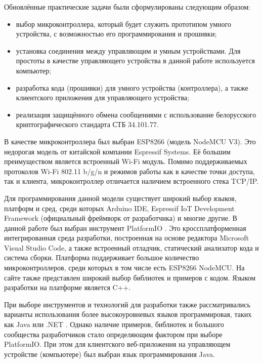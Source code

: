 	Обновлённые практические задачи были сформулированы следующим образом:
	
	\begin{itemize}
		\item выбор микроконтроллера, который будет служить прототипом умного устройства,
		с возможностью его программирования и прошивки;
		\item установка соединения между управляющим и умным устройствами. Для простоты в качестве
		управляющего устройства в данной работе используется компьютер;
		\item разработка кода (прошивки) для умного устройства (контроллера), а также клиентского
		приложения для управляющего устройства;
		\item реализация защищённого обмена сообщениями с использование белорусского криптографического
		стандарта СТБ 34.101.77.
	\end{itemize}

	В качестве микроконтроллера был выбран ESP8266 (модель NodeMCU V3). Это недорогая модель от
	китайской компании Espressif Systems. Её большим преимуществом является встроенный Wi-Fi модуль. 
	Помимо поддерживаемых протоколов Wi-Fi 802.11 b/g/n и режимов работы как в качестве точки доступа,
	так и клиента, микроконтроллер отличается наличием встроенного стека TCP/IP.
	
	Для программирования данной модели существует широкий выбор языков, платформ и сред, среди
	которых Arduino IDE, Espressif IoT Development Framework (официальный фреймворк от разработчика)
	и многие другие. В данной работе был выбран инструмент PlatformIO \cite{platformio}. Это
	кроссплатформенная интегрированная среда разработки, построенная на основе редактора Microsoft 
	Visual Studio Code, а также встроенный отладчик, статический анализатор кода и система сборки.
	Платформа поддерживает большое количество микроконтроллеров, среди которых в том числе есть
	ESP8266 NodeMCU. На сайте также представлен широкий выбор библиотек и примеров с кодом.
	Языком разработки на платформе является C++.
	
	При выборе инструментов и технологий для разработки также рассматривались варианты использования
	более высокоуровневых языков программировая, таких как Java \cite{microej} или .NET \cite{nanoFramework}.
	Однако наличие примеров, библиотек и большого сообщества разработчиков стало определяющим
	фактором при выборе PlatformIO. При этом для клиентского веб-приложения на управляющем устройстве
	(компьютере) был выбран язык программирования Java.
	

